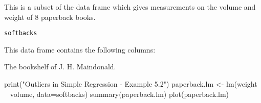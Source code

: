 \begin{Description}\relax
This is a subset of the  data frame 
which gives measurements
on the volume and weight of 8 paperback books.
\end{Description}
\begin{Usage}
\begin{verbatim}softbacks\end{verbatim}
\end{Usage}
\begin{Format}\relax
This data frame contains the following columns:
\end{Format}
\begin{Source}\relax
The bookshelf of J. H. Maindonald.
\end{Source}
\begin{Examples}
\begin{ExampleCode}
print("Outliers in Simple Regression - Example 5.2")
paperback.lm <- lm(weight ~ volume, data=softbacks)
summary(paperback.lm)
plot(paperback.lm)
\end{ExampleCode}
\end{Examples}

